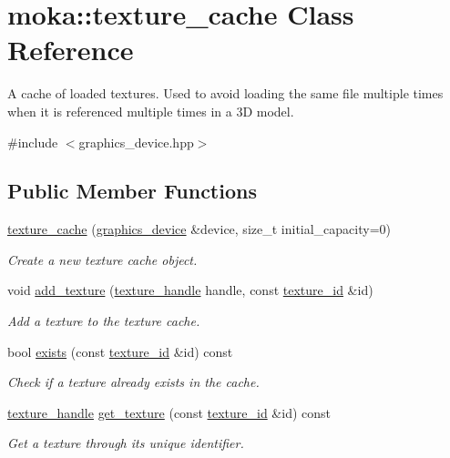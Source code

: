 \hypertarget{classmoka_1_1texture__cache}{}\section{moka\+::texture\+\_\+cache Class Reference}
\label{classmoka_1_1texture__cache}


A cache of loaded textures. Used to avoid loading the same file multiple times when it is referenced multiple times in a 3D model.  




{\ttfamily \#include $<$graphics\+\_\+device.\+hpp$>$}

\subsection*{Public Member Functions}
\begin{DoxyCompactItemize}
\item 
\mbox{\hyperlink{classmoka_1_1texture__cache_a3f3e8968e3b9562371f11bc3a525a1c6}{texture\+\_\+cache}} (\mbox{\hyperlink{classmoka_1_1graphics__device}{graphics\+\_\+device}} \&device, size\+\_\+t initial\+\_\+capacity=0)
\begin{DoxyCompactList}\small\item\em Create a new texture cache object. \end{DoxyCompactList}\item 
void \mbox{\hyperlink{classmoka_1_1texture__cache_a42a0d37e28d1b7141f9343a9703a5546}{add\+\_\+texture}} (\mbox{\hyperlink{structmoka_1_1texture__handle}{texture\+\_\+handle}} handle, const \mbox{\hyperlink{namespacemoka_a562063640e8ad24ef94c1be0fd9079cf}{texture\+\_\+id}} \&id)
\begin{DoxyCompactList}\small\item\em Add a texture to the texture cache. \end{DoxyCompactList}\item 
bool \mbox{\hyperlink{classmoka_1_1texture__cache_ad065ce49f3e79d64b595b5b70da1f19b}{exists}} (const \mbox{\hyperlink{namespacemoka_a562063640e8ad24ef94c1be0fd9079cf}{texture\+\_\+id}} \&id) const
\begin{DoxyCompactList}\small\item\em Check if a texture already exists in the cache. \end{DoxyCompactList}\item 
\mbox{\hyperlink{structmoka_1_1texture__handle}{texture\+\_\+handle}} \mbox{\hyperlink{classmoka_1_1texture__cache_a1508f10e1770cca6042fcecc0697d8b7}{get\+\_\+texture}} (const \mbox{\hyperlink{namespacemoka_a562063640e8ad24ef94c1be0fd9079cf}{texture\+\_\+id}} \&id) const
\begin{DoxyCompactList}\small\item\em Get a texture through its unique identifier. \end{DoxyCompactList}\end{DoxyCompactItemize}


